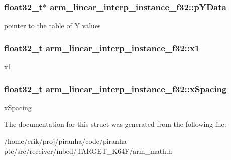 \subsubsection[{\texorpdfstring{p\+Y\+Data}{pYData}}]{\setlength{\rightskip}{0pt plus 5cm}float32\+\_\+t$\ast$ arm\+\_\+linear\+\_\+interp\+\_\+instance\+\_\+f32\+::p\+Y\+Data}\hypertarget{structarm__linear__interp__instance__f32_ab373001f6afad0850359c344a4d7eee4}{}\label{structarm__linear__interp__instance__f32_ab373001f6afad0850359c344a4d7eee4}
pointer to the table of Y values 
\subsubsection[{\texorpdfstring{x1}{x1}}]{\setlength{\rightskip}{0pt plus 5cm}float32\+\_\+t arm\+\_\+linear\+\_\+interp\+\_\+instance\+\_\+f32\+::x1}\hypertarget{structarm__linear__interp__instance__f32_a08352dc6ea82fbc0827408e018535481}{}\label{structarm__linear__interp__instance__f32_a08352dc6ea82fbc0827408e018535481}
x1 
\subsubsection[{\texorpdfstring{x\+Spacing}{xSpacing}}]{\setlength{\rightskip}{0pt plus 5cm}float32\+\_\+t arm\+\_\+linear\+\_\+interp\+\_\+instance\+\_\+f32\+::x\+Spacing}\hypertarget{structarm__linear__interp__instance__f32_aa8e2d686b5434a406d390b347b183511}{}\label{structarm__linear__interp__instance__f32_aa8e2d686b5434a406d390b347b183511}
x\+Spacing 

The documentation for this struct was generated from the following file\+:\begin{DoxyCompactItemize}
\item 
/home/erik/proj/piranha/code/piranha-\/ptc/src/receiver/mbed/\+T\+A\+R\+G\+E\+T\+\_\+\+K64\+F/arm\+\_\+math.\+h\end{DoxyCompactItemize}
